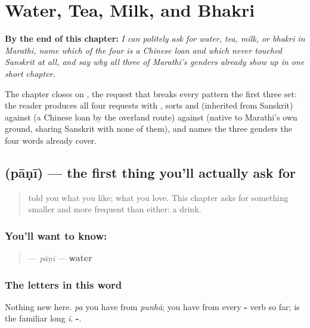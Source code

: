 
\chapter{Water, Tea, Milk, and Bhakri}
\label{ch:mr-request-food-drink}

\begin{chapteropening}
\textbf{By the end of this chapter:} \emph{I can politely ask for water, tea, milk, or bhakri in Marathi, name which of the four is a Chinese loan and which never touched Sanskrit at all, and say why all three of Marathi's genders already show up in one short chapter.}

The chapter closes on , the request that breaks every pattern the first three set: the reader produces all four requests with , sorts  and  (inherited from Sanskrit) against  (a Chinese loan by the overland route) against  (native to Marathi's own ground, sharing Sanskrit with none of them), and names the three genders the four words already cover.
\end{chapteropening}

\section[\texorpdfstring{\mr{पाणी} (pāṇī)}{पाणी (pāṇī)}]{ (pāṇī) — the first thing you'll actually ask for}

\label{lesson:MR-C10-paani}



\begin{quote}
\textbf{} told you what you like; \textbf{ } what you love. This chapter asks for something smaller and more frequent than either: a drink.
\end{quote}

\subsection*{You'll want to know: }
\begin{quote}
\textbf{} — \emph{pāṇī} — \textbf{water}
\end{quote}

\subsection*{The letters in this word}
Nothing new here. \textbf{} \emph{pa} you have from \emph{punhā}; \textbf{} you have from every \textbf{-} verb so far; \textbf{} is the familiar long \emph{ī}. \textbf{-}.

